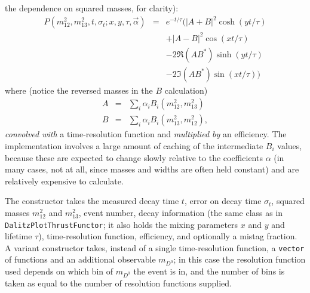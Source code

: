 \documentclass[12pt,pdflatex]{article}
\begin{document}
\begin{itemize}
the dependence on squared masses, for clarity):
\begin{eqnarray}
\label{eq:fullmix}
P(m^2_{12}, m^2_{13}, t, \sigma_t;x,y,\tau,\vec\alpha) &=&
e^{-t/\tau}\Big(|A+B|^2\cosh(yt/\tau)\\
&& + |A-B|^2\cos(xt/\tau)\\
&& - 2\Re(AB^*)\sinh(yt/\tau)\\
&& - 2\Im(AB^*)\sin(xt/\tau)\Big)
\end{eqnarray}
where (notice the reversed masses in the $B$ calculation)
\begin{eqnarray}
A &=& \sum\limits_i \alpha_iB_i(m^2_{12}, m^2_{13}) \\
B &=& \sum\limits_i \alpha_iB_i(m^2_{13}, m^2_{12}), 
\end{eqnarray}
\emph{convolved with} a time-resolution function and \emph{multiplied by} an efficiency. 
The implementation involves a large
amount of caching of the intermediate $B_i$ values, because these are expected
to change slowly relative to the coefficients $\alpha$ (in many cases, not at all, 
since masses and widths are often held constant) and are relatively expensive to calculate. 

The constructor takes the measured decay time $t$, error on decay time $\sigma_t$, 
squared masses $m^2_{12}$ and $m^2_{13}$, event number, decay information (the same
class as in \texttt{DalitzPlotThrustFunctor}; it also holds the mixing parameters
$x$ and $y$ and lifetime $\tau$), time-resolution function, efficiency, and optionally
a mistag fraction. A variant constructor takes, instead of a single time-resolution
function, a \texttt{vector} of functions and an additional observable $m_{D^0}$;
in this case the resolution function used depends on which bin of $m_{D^0}$ the event
is in, and the number of bins is taken as equal to the number of resolution functions
supplied. 


\end{itemize}
\end{document}
